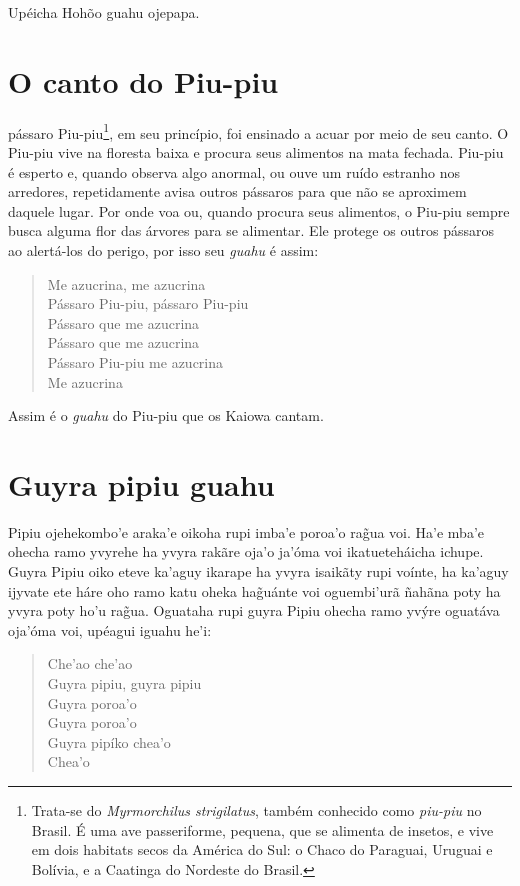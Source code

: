 Upéicha Hohõo guahu ojepapa.

\chapter{O canto do Piu-piu}

 pássaro Piu-piu\footnote{Trata-se do \textit{Myrmorchilus strigilatus},
  também conhecido como \textit{piu-piu} no Brasil. É uma ave passeriforme,
  pequena, que se alimenta de insetos, e vive em dois habitats secos da
  América do Sul: o Chaco do Paraguai, Uruguai e Bolívia, e a Caatinga
  do Nordeste do Brasil.}, em seu princípio, foi ensinado a acuar por
meio de seu canto. O Piu-piu vive na floresta baixa e procura seus
alimentos na mata fechada. Piu-piu é esperto e, quando observa algo
anormal, ou ouve um ruído estranho nos arredores, repetidamente avisa
outros pássaros para que não se aproximem daquele lugar. Por onde voa
ou, quando procura seus alimentos, o Piu-piu sempre busca alguma flor
das árvores para se alimentar. Ele protege os outros pássaros ao
alertá-los do perigo, por isso seu \textit{guahu} é assim:

\begin{verse}
Me azucrina, me azucrina\\
Pássaro Piu-piu, pássaro Piu-piu\\
Pássaro que me azucrina\\
Pássaro que me azucrina\\
Pássaro Piu-piu me azucrina\\
Me azucrina
\end{verse}

Assim é o \textit{guahu} do Piu-piu que os Kaiowa cantam.

\chapter{Guyra pipiu guahu}

 Pipiu ojehekombo'e araka'e oikoha rupi imba'e poroa'o rag̃ua voi.
Ha'e mba'e ohecha ramo yvyrehe ha yvyra rakãre oja'o ja'óma voi
ikatueteháicha ichupe. Guyra Pipiu oiko eteve ka'aguy ikarape ha yvyra
isaikãty rupi voínte, ha ka'aguy ijyvate ete háre oho ramo katu oheka
hag̃uánte voi oguembi'urã ñahãna poty ha yvyra poty ho'u rag̃ua. Oguataha
rupi guyra Pipiu ohecha ramo yvýre oguatáva oja'óma voi, upéagui iguahu
he'i:


\begin{verse}
Che'ao che'ao\\
Guyra pipiu, guyra pipiu\\
Guyra poroa'o\\
Guyra poroa'o\\
Guyra pipíko chea'o\\
Chea'o
\end{verse}

